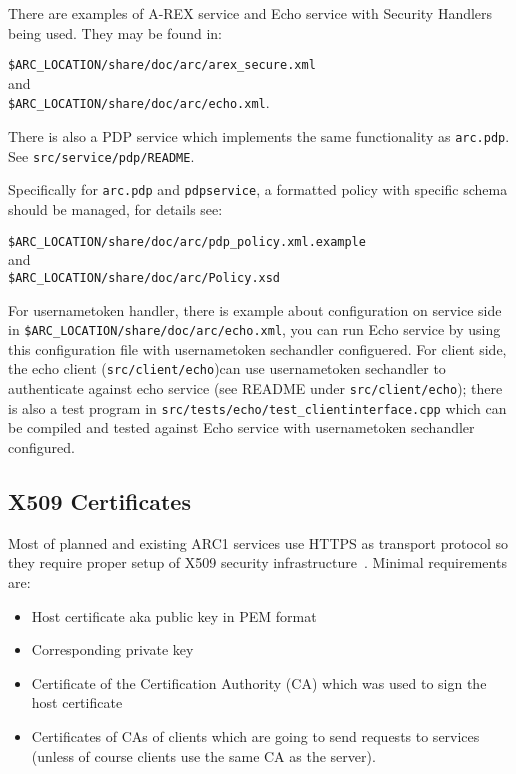 \documentclass{article}                            %
\begin{document}
There are examples of A-REX service and Echo service with Security Handlers
being used. They may be found in:

\verb|$ARC_LOCATION/share/doc/arc/arex_secure.xml| \\and\\
\verb|$ARC_LOCATION/share/doc/arc/echo.xml|.

There is also a PDP service which implements the same functionality as
\texttt{arc.pdp}. See \texttt{src/service/pdp/README}.

Specifically for \texttt{arc.pdp} and \texttt{pdpservice}, a formatted policy
with specific schema should be managed, for details see:

\verb|$ARC_LOCATION/share/doc/arc/pdp_policy.xml.example| \\and\\
\verb|$ARC_LOCATION/share/doc/arc/Policy.xsd|

For usernametoken handler, there is example about configuration on service side
in \verb|$ARC_LOCATION/share/doc/arc/echo.xml|, you can run Echo service by
using this configuration file with usernametoken sechandler configuered. For
client side, the echo client (\texttt{src/client/echo})can use usernametoken
sechandler to authenticate against echo service (see README under
\verb|src/client/echo|); there is also a test program in
\verb|src/tests/echo/test_clientinterface.cpp| which can be compiled and
tested against Echo service with usernametoken sechandler configured.

\subsection{X509 Certificates}
\label{sec:x509}

Most of  planned and existing ARC1 services use HTTPS as transport protocol so
they require proper setup of X509 security infrastructure~\cite{x509}. Minimal
requirements are:

\begin{itemize}
\item Host certificate aka public key in PEM format
\item Corresponding private key
\item Certificate of the Certification Authority (CA) which was used to sign
the host certificate
\item Certificates of CAs of clients which are going to send requests to
services (unless of course clients use the same CA as the server).
\end{itemize}
\end{document}
